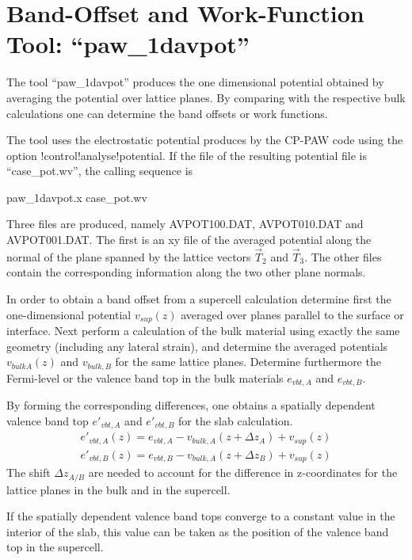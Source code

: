 \documentclass[final,12pt]{article}
\begin{document}
{{{{{{%
\newpage
\section{Band-Offset and Work-Function Tool: ``paw\_1davpot''}
The tool ``paw\_1davpot'' produces the one dimensional potential
obtained by averaging the potential over lattice planes. By comparing
with the respective bulk calculations one can determine the band
offsets or work functions.

The tool uses the electrostatic potential produces by the CP-PAW code
using the option !control!analyse!potential. If the file of the
resulting potential file is ``case\_pot.wv'',  the calling sequence is
\begin{center}
paw\_1davpot.x case\_pot.wv
\end{center}
Three files are produced, namely AVPOT100.DAT, AVPOT010.DAT and
AVPOT001.DAT. The first is an xy file of the averaged potential along
the normal of the plane spanned by the lattice vectors $\vec{T}_2$ and
$\vec{T}_3$. The other files contain the corresponding information
along the two other plane normals.

In order to obtain a band offset from a supercell calculation
determine first the one-dimensional potential $v_{sup}(z)$ averaged
over planes parallel to the surface or interface. Next perform a
calculation of the bulk material using exactly the same geometry
(including any lateral strain), and determine the averaged potentials
$v_{bulk A}(z)$ and $v_{bulk,B}$ for the same lattice planes.
Determine furthermore the Fermi-level or the valence band top in the bulk
materials $e_{vbt,A}$ and $e_{vbt,B}$.

By forming the corresponding differences, one obtains a spatially
dependent valence band top $e'_{vbt,A}$ and $e'_{vbt,B}$ 
for the slab calculation.
\begin{eqnarray*}
e'_{vbt,A}(z)=e_{vbt,A}-v_{bulk,A}(z+\Delta z_A)+v_{sup}(z)
\\
e'_{vbt,B}(z)=e_{vbt,B}-v_{bulk,A}(z+\Delta z_B)+v_{sup}(z)
\end{eqnarray*}
The shift $\Delta z_{A/B}$ are needed to account for the difference in
z-coordinates for the lattice planes in the bulk and in the supercell.

If the spatially dependent valence band tops converge to a constant
value in the interior of the slab, this value can be taken as the
position of the valence band top in the supercell.
 

}}}}}}
\end{document}
